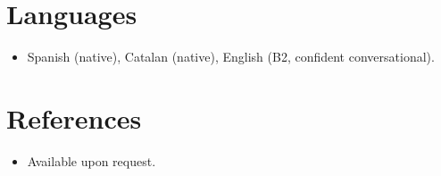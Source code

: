 \documentclass[11pt,a4paper,sans]{moderncv}
\begin{document}

\section{Languages}
\vspace{1pt}
\begin{itemize}
\item Spanish (native), Catalan (native), English (B2, confident conversational).
\end{itemize}


\section{References}
\vspace{1pt}
\begin{itemize}
\item{Available upon request.}
\end{itemize}
\end{document}
